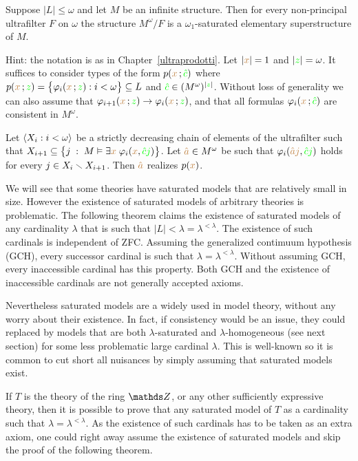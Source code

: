 \documentclass[creche.tex]{subfiles}
\begin{document}
\begin{exercise}
Suppose $|L|\le\omega$ and let $M$ be an infinite structure. Then for every non-principal ultrafilter $F$ on $\omega$ the structure $M^\omega/F$ is a $\omega_1$-saturated elementary superstructure of $M$.

Hint: the notation is as in Chapter~\ref{ultraprodotti}. Let $|{\color{brown} x}|=1$ and 
$|{\color{green} z}|=\omega$. It suffices to consider types of the form $p({\color{brown} x}\,;{\color{green}\hat c})$ where $p({\color{brown} x}\,;{\color{green} z})=\big\{\varphi_i({\color{brown} x}\,;{\color{green} z}):i<\omega\big\}\subseteq L$ and ${\color{green}\hat c}\in(M^\omega)^{|{\color{green} z}|}$. Without loss of generality we can also assume that $\varphi_{i+1}({\color{brown} x}\,;{\color{green} z})\rightarrow\varphi_i({\color{brown} x}\,;{\color{green} z})$, and that all formulas $\varphi_i({\color{brown} x}\,;{\color{green}\hat c})$ are consistent in $M^\omega$. 

Let $\langle X_i:i<\omega\rangle$ be a strictly decreasing chain of elements of the ultrafilter such that  $X_{i+1}\subseteq\big\{j\;:\;M\vDash\exists{\color{brown}x}\;\varphi_i({\color{brown} x},{\color{green}\hat cj})\big\}$. Let ${\color{brown}\hat a}\in M^\omega$ be such that  $\varphi_i({\color{brown}\hat aj},{\color{green}\hat cj})$ holds for every $j\in X_i\smallsetminus X_{i+1}$. Then ${\color{brown}\hat a}$ realizes $p({\color{brown} x})$.\QED
\end{exercise}

We will see that some theories have saturated models that are relatively small in size. However the existence of saturated models of arbitrary theories is problematic. The following theorem claims the existence of saturated models of any cardinality $\lambda$ that is such that $|L|<\lambda=\lambda^{<\lambda}$. The existence of such cardinals is independent of ZFC. Assuming the generalized contimuum hypothesis (GCH), every successor cardinal is such that $\lambda=\lambda^{<\lambda}$. Without assuming GCH, every inaccessible cardinal has this property. Both GCH and the existence of inaccessible cardinals are not generally accepted axioms. 

Nevertheless saturated models are a widely used in model theory, without any worry about their existence. In fact, if consistency would be an issue, they could replaced by models that are both $\lambda$-saturated and $\lambda$-homogeneous (see next section) for some less problematic large cardinal $\lambda$. This is well-known so it is common to cut short all nuisances by simply assuming that saturated models exist.

If $T$ is the theory of the ring $\ZZ$, or any other sufficiently expressive theory, then it is possible to prove that any saturated model of $T$ as a cardinality such that $\lambda=\lambda^{<\lambda}$. As the existence of such cardinals has to be taken as an extra axiom, one could right away assume the existence of saturated models and skip the proof of the following theorem.
\end{document}
